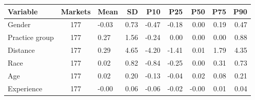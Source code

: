 
\begin{tabular}{lclrrrrrr}
\toprule
Variable & Markets & Mean & SD & P10 & P25 & P50 & P75 & P90\\
\midrule
Gender & 177 & -0.03 & 0.73 & -0.47 & -0.18 & 0.00 & 0.19 & 0.47\\
Practice group & 177 & 0.27 & 1.56 & -0.24 & 0.00 & 0.00 & 0.00 & 0.88\\
Distance & 177 & 0.29 & 4.65 & -4.20 & -1.41 & 0.01 & 1.79 & 4.35\\
Race & 177 & 0.02 & 0.82 & -0.84 & -0.25 & 0.00 & 0.31 & 0.73\\
Age & 177 & 0.02 & 0.20 & -0.13 & -0.04 & 0.02 & 0.08 & 0.21\\
Experience & 177 & -0.00 & 0.06 & -0.06 & -0.02 & -0.00 & 0.01 & 0.04\\
\bottomrule
\end{tabular}
